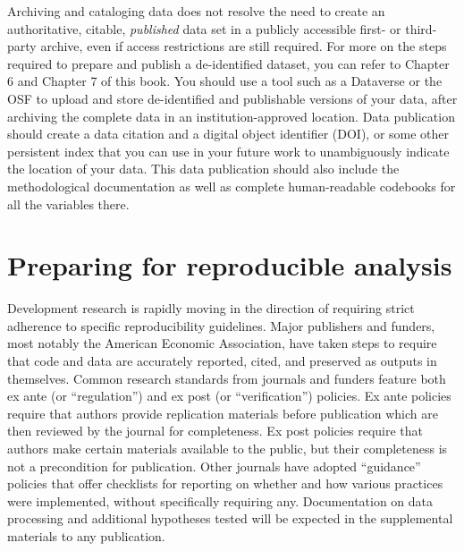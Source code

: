 Archiving and cataloging data does not resolve
the need to create an authoritative, citable, \textit{published} data set
in a publicly accessible first- or third-party archive,
even if access restrictions are still required.
For more on the steps required to prepare and publish a de-identified dataset,
you can refer to Chapter 6 and Chapter 7 of this book.
You should use a tool such as a Dataverse or the OSF
to upload and store de-identified and publishable versions of your data,
after archiving the complete data in an institution-approved location.
Data publication should create a data citation and a digital object identifier (DOI),
or some other persistent index that you can use in your future work
to unambiguously indicate the location of your data.
This data publication should also include the methodological documentation
as well as complete human-readable codebooks for all the variables there.

\section{Preparing for reproducible analysis}


Development research is rapidly moving in the direction of requiring strict adherence
to specific reproducibility guidelines.\cite{christensen2018transparency}
Major publishers and funders, most notably the American Economic Association,
have taken steps to require that code and data
are accurately reported, cited, and preserved as outputs in themselves.
Common research standards from journals and funders feature both ex ante
(or ``regulation'') and ex post (or ``verification'') policies.\cite{stodden2013toward}
Ex ante policies require that authors
provide replication materials before publication
which are then reviewed by the journal for completeness.
Ex post policies require that authors make certain materials available to the public,
but their completeness is not a precondition for publication.
Other journals have adopted ``guidance'' policies that offer checklists
for reporting on whether and how various practices were implemented,
without specifically requiring any.\cite{nosek2015promoting}
Documentation on data processing and additional hypotheses tested
will be expected in the supplemental materials to any publication.

